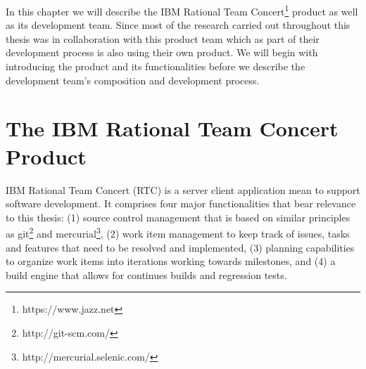 In this chapter we will describe the IBM Rational Team Concert\footnote{https://www.jazz.net} product as well as its development team.
Since most of the research carried out throughout this thesis was in collaboration with this product team which as part of their development process is also using their own product.
We will begin with introducing the product and its functionalities before we describe the development team's composition and development process.

\section{The IBM Rational Team Concert Product}
IBM Rational Team Concert (RTC) is a server client application mean to support software development.
It comprises four major functionalities that bear relevance to this thesis:
(1) source control management that is based on similar principles as git\footnote{http://git-scm.com/} and mercurial\footnote{http://mercurial.selenic.com/}, (2) work item management to keep track of issues, tasks and features that need to be resolved and implemented, (3) planning capabilities to organize work items into iterations working towards milestones, and (4) a build engine that allows for continues builds and regression tests.

